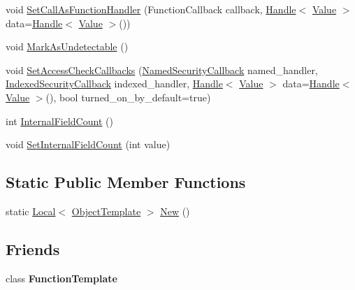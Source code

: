 \begin{DoxyCompactItemize}
\item 
void \hyperlink{classv8_1_1_object_template_a5a7c6acbee1a04deb7c2cd43896b34ac}{Set\+Call\+As\+Function\+Handler} (Function\+Callback callback, \hyperlink{classv8_1_1_handle}{Handle}$<$ \hyperlink{classv8_1_1_value}{Value} $>$ data=\hyperlink{classv8_1_1_handle}{Handle}$<$ \hyperlink{classv8_1_1_value}{Value} $>$())
\item 
void \hyperlink{classv8_1_1_object_template_a7e40ef313b44c2ad336c73051523b4f8}{Mark\+As\+Undetectable} ()
\item 
void \hyperlink{classv8_1_1_object_template_acd0c47ecc715fa1256dc95524a4e8608}{Set\+Access\+Check\+Callbacks} (\hyperlink{namespacev8_ab5cafda0c556bba990c660ce9c904e0d}{Named\+Security\+Callback} named\+\_\+handler, \hyperlink{namespacev8_aebbcc7837753e51112d944ad96520da1}{Indexed\+Security\+Callback} indexed\+\_\+handler, \hyperlink{classv8_1_1_handle}{Handle}$<$ \hyperlink{classv8_1_1_value}{Value} $>$ data=\hyperlink{classv8_1_1_handle}{Handle}$<$ \hyperlink{classv8_1_1_value}{Value} $>$(), bool turned\+\_\+on\+\_\+by\+\_\+default=true)
\item 
int \hyperlink{classv8_1_1_object_template_a43de785d594d8c01b18230b1aa79e31c}{Internal\+Field\+Count} ()
\item 
void \hyperlink{classv8_1_1_object_template_ab63916ac584a76bca8ba541f86ce9fce}{Set\+Internal\+Field\+Count} (int value)
\end{DoxyCompactItemize}
\subsection*{Static Public Member Functions}
\begin{DoxyCompactItemize}
\item 
static \hyperlink{classv8_1_1_local}{Local}$<$ \hyperlink{classv8_1_1_object_template}{Object\+Template} $>$ \hyperlink{classv8_1_1_object_template_a394801526a9e9eb6df349a0eb8dfa0d0}{New} ()
\end{DoxyCompactItemize}
\subsection*{Friends}
\begin{DoxyCompactItemize}
\item 
\hypertarget{classv8_1_1_object_template_a334168ad1a5f39cf17b818ca3356aacd}{}class {\bfseries Function\+Template}\label{classv8_1_1_object_template_a334168ad1a5f39cf17b818ca3356aacd}

\end{DoxyCompactItemize}


